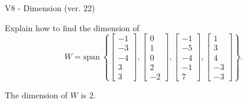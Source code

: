 \begin{exercise}
  \begin{exerciseTitle}V8 - Dimension (ver. 22)\end{exerciseTitle}
  \begin{exerciseStatement}
    Explain how to find the dimension of 
\[W=\mathrm{span}\ \left\{\left[\begin{array}{r}
-1 \\
-3 \\
-4 \\
3 \\
3
\end{array}\right] , \left[\begin{array}{r}
0 \\
1 \\
0 \\
2 \\
-2
\end{array}\right] , \left[\begin{array}{r}
-1 \\
-5 \\
-4 \\
-1 \\
7
\end{array}\right] , \left[\begin{array}{r}
1 \\
3 \\
4 \\
-3 \\
-3
\end{array}\right]\right\}.\]



  \end{exerciseStatement}
  \begin{exerciseAnswer}
   The dimension of \(W\) is  \(2\).
  


  \end{exerciseAnswer}
\end{exercise}
